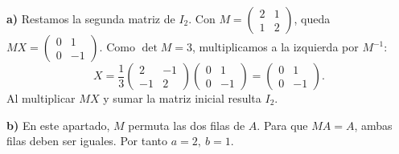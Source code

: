 \textbf{a)} Restamos la segunda matriz de $I_2$.
Con $M=\begin{pmatrix}2&1\\1&2\end{pmatrix}$,
queda $MX=\begin{pmatrix}0&1\\0&-1\end{pmatrix}$.
Como $\det M=3$, multiplicamos a la izquierda por $M^{-1}$:
\[
X=\frac13\begin{pmatrix}2&-1\\-1&2\end{pmatrix}
\begin{pmatrix}0&1\\0&-1\end{pmatrix}
=\boxed{\begin{pmatrix}0&1\\0&-1\end{pmatrix}}.
\]
Al multiplicar $MX$ y sumar la matriz inicial resulta $I_2$.

\textbf{b)} En este apartado, $M$ permuta las dos filas de $A$.
Para que $MA=A$, ambas filas deben ser iguales.
Por tanto $\boxed{a=2,\ b=1}$.
